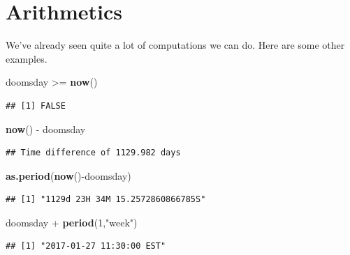 \documentclass[]{tufte-book}
\newenvironment{Shaded}{}{}
\newcommand{\DecValTok}[1]{\textcolor[rgb]{0.25,0.63,0.44}{#1}}
\newcommand{\KeywordTok}[1]{\textcolor[rgb]{0.00,0.44,0.13}{\textbf{#1}}}
\newcommand{\NormalTok}[1]{#1}
\newcommand{\OperatorTok}[1]{\textcolor[rgb]{0.40,0.40,0.40}{#1}}
\newcommand{\StringTok}[1]{\textcolor[rgb]{0.25,0.44,0.63}{#1}}
\begin{document}
\hypertarget{arithmetics}{%
\section{Arithmetics}\label{arithmetics}}

We've already seen quite a lot of computations we can do. Here are some other examples.

\begin{Shaded}
\begin{Highlighting}[]
\NormalTok{doomsday }\OperatorTok{>=}\StringTok{ }\KeywordTok{now}\NormalTok{()}
\end{Highlighting}
\end{Shaded}

\begin{verbatim}
## [1] FALSE
\end{verbatim}

\begin{Shaded}
\begin{Highlighting}[]
\KeywordTok{now}\NormalTok{() }\OperatorTok{-}\StringTok{ }\NormalTok{doomsday}
\end{Highlighting}
\end{Shaded}

\begin{verbatim}
## Time difference of 1129.982 days
\end{verbatim}

\begin{Shaded}
\begin{Highlighting}[]
\KeywordTok{as.period}\NormalTok{(}\KeywordTok{now}\NormalTok{()}\OperatorTok{-}\NormalTok{doomsday)}
\end{Highlighting}
\end{Shaded}

\begin{verbatim}
## [1] "1129d 23H 34M 15.2572860866785S"
\end{verbatim}

\begin{Shaded}
\begin{Highlighting}[]
\NormalTok{doomsday }\OperatorTok{+}\StringTok{ }\KeywordTok{period}\NormalTok{(}\DecValTok{1}\NormalTok{,}\StringTok{"week"}\NormalTok{)}
\end{Highlighting}
\end{Shaded}

\begin{verbatim}
## [1] "2017-01-27 11:30:00 EST"
\end{verbatim}
\end{document}
